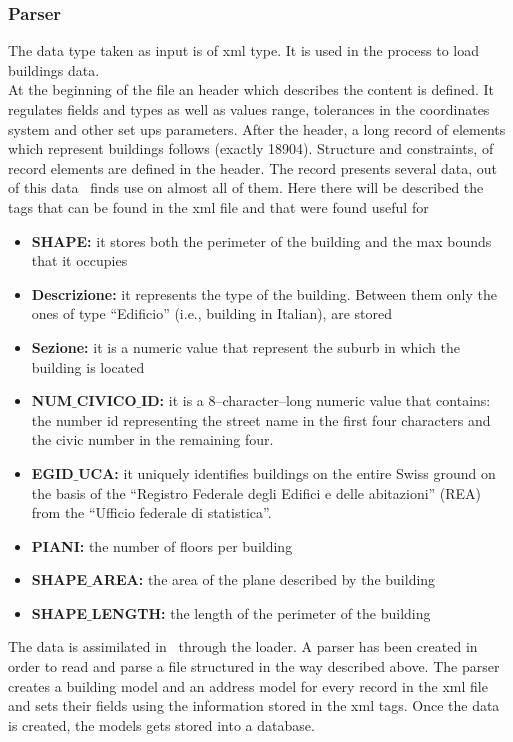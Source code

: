 \subsubsection{Parser}
The data type taken as input is of xml type. It is used in the process to load buildings data.\\
At the beginning of the file an header which describes the content is defined. It regulates fields and types as well as values range, tolerances in the coordinates system and other set ups parameters. After the header, a long record of elements which represent buildings follows (exactly 18904). Structure and constraints, of record elements are defined in the header. The record presents several data, out of this data  \applicationName\ finds use on almost all of them. Here there will be described the tags that can be found in the xml file and that were found useful for \applicationName\:
\begin{itemize}
	\item {\bf SHAPE:} it stores both the perimeter of the building and the max bounds that it occupies
	\item {\bf Descrizione:} it represents the type of the building. Between them only the ones of type ``Edificio'' (i.e., building in Italian), are stored
	\item {\bf Sezione:} it is a numeric value that represent the suburb in which the building is located
	\item {\bf NUM$\_$CIVICO$\_$ID:} it is a 8--character--long numeric value that contains: the number id representing the street name in the first four characters and the civic number in the remaining four.
	\item {\bf EGID$\_$UCA:} it uniquely identifies buildings on the entire Swiss ground on the basis of the ``Registro Federale degli Edifici e delle abitazioni'' (REA) from the ``Ufficio federale di statistica''.
	\item {\bf PIANI:} the number of floors per building
	\item {\bf SHAPE$\_$AREA:} the area of the plane described by the building
	\item {\bf SHAPE$\_$LENGTH:} the length of the perimeter of the building
\end{itemize}
The data is assimilated in \applicationName\ through the loader. A parser has been created in order to read and parse a file structured in the way described above. The parser creates a building model and an address model for every record in the xml file and sets their fields using the information stored in the xml tags. Once the data is created, the models gets stored into a database.\\

